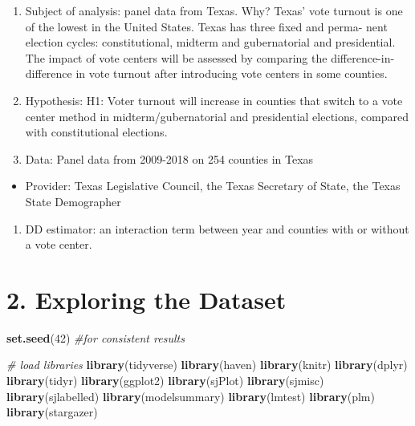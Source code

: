 \documentclass[
]{article}
\newenvironment{Shaded}{\begin{snugshade}}{\end{snugshade}}
\newcommand{\CommentTok}[1]{\textcolor[rgb]{0.56,0.35,0.01}{\textit{#1}}}
\newcommand{\DecValTok}[1]{\textcolor[rgb]{0.00,0.00,0.81}{#1}}
\newcommand{\KeywordTok}[1]{\textcolor[rgb]{0.13,0.29,0.53}{\textbf{#1}}}
\newcommand{\NormalTok}[1]{#1}
\providecommand{\tightlist}{%
  \setlength{\itemsep}{0pt}\setlength{\parskip}{0pt}}
\begin{document}
\begin{enumerate}
\def\labelenumi{\arabic{enumi}.}
\setcounter{enumi}{3}
\item
  Subject of analysis: panel data from Texas. Why? Texas' vote turnout
  is one of the lowest in the United States. Texas has three fixed and
  perma- nent election cycles: constitutional, midterm and gubernatorial
  and presidential. The impact of vote centers will be assessed by
  comparing the difference-in-difference in vote turnout after
  introducing vote centers in some counties.
\item
  Hypothesis: H1: Voter turnout will increase in counties that switch to
  a vote center method in midterm/gubernatorial and presidential
  elections, compared with constitutional elections.
\item
  Data: Panel data from 2009-2018 on 254 counties in Texas
\end{enumerate}

\begin{itemize}
\tightlist
\item
  Provider: Texas Legislative Council, the Texas Secretary of State, the
  Texas State Demographer
\end{itemize}

\begin{enumerate}
\def\labelenumi{\arabic{enumi}.}
\setcounter{enumi}{6}
\tightlist
\item
  DD estimator: an interaction term between year and counties with or
  without a vote center.
\end{enumerate}

\hypertarget{exploring-the-dataset}{%
\section{2. Exploring the Dataset}\label{exploring-the-dataset}}

\begin{Shaded}
\begin{Highlighting}[]
\KeywordTok{set.seed}\NormalTok{(}\DecValTok{42}\NormalTok{) }\CommentTok{#for consistent results}

\CommentTok{# load libraries}
\KeywordTok{library}\NormalTok{(tidyverse)}
\KeywordTok{library}\NormalTok{(haven) }
\KeywordTok{library}\NormalTok{(knitr)}
\KeywordTok{library}\NormalTok{(dplyr)}
\KeywordTok{library}\NormalTok{(tidyr) }
\KeywordTok{library}\NormalTok{(ggplot2) }
\KeywordTok{library}\NormalTok{(sjPlot)}
\KeywordTok{library}\NormalTok{(sjmisc)}
\KeywordTok{library}\NormalTok{(sjlabelled)}
\KeywordTok{library}\NormalTok{(modelsummary)}
\KeywordTok{library}\NormalTok{(lmtest)}
\KeywordTok{library}\NormalTok{(plm)}
\KeywordTok{library}\NormalTok{(stargazer)}
\end{Highlighting}
\end{Shaded}
\end{document}
